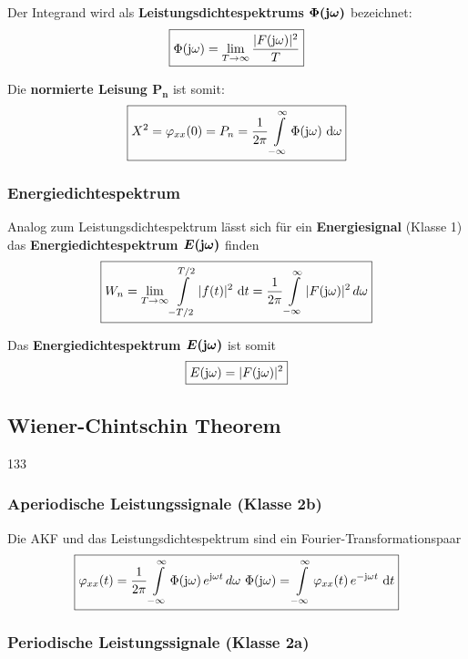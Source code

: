 \vspace{0.2cm}

Der Integrand wird als \textbf{Leistungsdichtespektrums $\bm{\Phi(\mathrm{j} \omega)}$} bezeichnet:
$$ \boxed{ \Phi(\mathrm{j} \omega) = \lim\limits_{T \to \infty} \frac{|F(\mathrm{j} \omega) |^2}{T} } $$

\vspace{0.2cm}

Die \textbf{normierte Leisung $\bm{P_n}$} ist somit:
$$ \boxed{ X^2 = \varphi_{xx}(0) = P_n = \frac{1}{2 \pi}  \int\limits_{- \infty}^{\infty}  \Phi(\mathrm{j} \omega) \, \mathop{} \! \mathrm{d} \omega } $$


\subsubsection{Energiedichtespektrum}
Analog zum Leistungsdichtespektrum lässt sich für ein \textbf{Energiesignal} (Klasse 1) das 
\textbf{Energiedichtespektrum $\bm{E(\mathrm{j} \omega)}$} finden
$$ \boxed{ W_n = \lim\limits_{T \to \infty} \int\limits_{-T/2}^{T/2} |f(t)|^2 \, \mathop{} \! \mathrm{d} t = \frac{1}{2 \pi}  \int\limits_{- \infty}^{\infty} |F(\mathrm{j} \omega)|^2 \, d\omega } $$

\vspace{0.2cm}

Das \textbf{Energiedichtespektrum $\bm{E(\mathrm{j} \omega)}$} ist somit
$$ \boxed{ E(\mathrm{j} \omega) = |F(\mathrm{j} \omega)|^2 } $$


\subsection{Wiener-Chintschin Theorem}{133}

\subsubsection{Aperiodische Leistungssignale (Klasse 2b)}

Die AKF und das Leistungsdichtespektrum sind ein Fourier-Transformationspaar
$$ \boxed{ \varphi_{xx}(t) = \frac{1}{2 \pi} \int\limits_{- \infty}^{\infty} \Phi(\mathrm{j} \omega) \, e^{\mathrm{j} \omega t} \, d\omega \, \relax \, \Phi(\mathrm{j} \omega) 
	= \int\limits_{- \infty}^{\infty} \varphi_{xx}(t) \, e^{-\mathrm{j} \omega t} \, \mathop{} \! \mathrm{d} t } $$


\subsubsection{Periodische Leistungssignale (Klasse 2a) }

